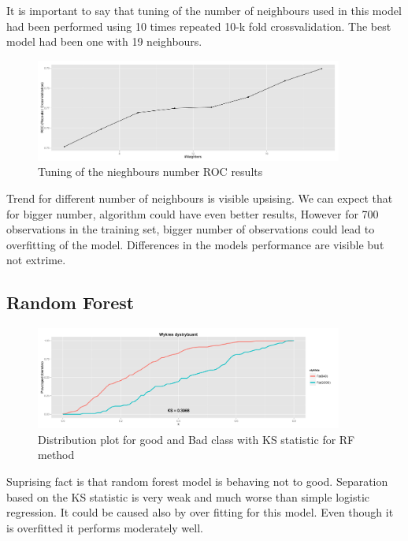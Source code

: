 \documentclass[10pt]{article}\usepackage[]{graphicx}\usepackage[]{color}
\begin{document}
It is important to say that tuning of the number of neighbours used in this model had been performed using 10 times repeated 10-k fold crossvalidation. The best model had been one with 19 neighbours. 

\clearpage

\begin{figure}[h!]
  \centering
  \includegraphics[width=0.9\textwidth]{Plots/TUNE_KNN}
  \caption
   {Tuning of the nieghbours number ROC results}
\end{figure}

Trend for different number of neighbours is visible upsising. We can expect that for bigger number, algorithm could have even better results, However for 700 observations in the training set, bigger number of observations could lead to overfitting of the model. Differences in the models performance are visible but not extrime. 

\subsection{Random Forest}

\begin{figure}[h!]
  \centering
  \includegraphics[width=0.9\textwidth]{Plots/RF_KS}
  \caption[Close up of \textit{Hemidactylus} sp.]
   {Distribution plot for good and Bad class with KS statistic for RF method}
\end{figure}

Suprising fact is that random forest model is behaving not to good. Separation based on the KS statistic is very weak and much worse than simple logistic regression. It could be caused also by over fitting for this model. 
Even though it is overfitted it performs moderately well. 
\end{document}
